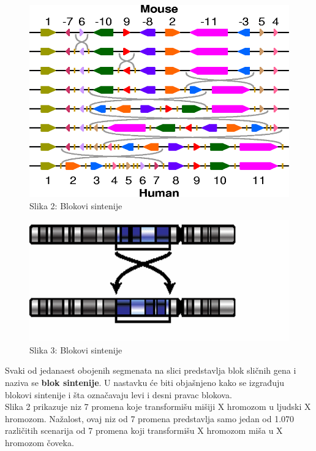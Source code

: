\documentclass{article}
\begin{document}
\begin{figure}[h!]
\centering
\includegraphics[scale=0.7]{slike/transformacija.png}
\caption{Slika 2: Blokovi sintenije}
\label{slika:X}
\end{figure}


\begin{figure}[h!]
\centering
\includegraphics[scale=0.7]{slike/transformacijaa.png}
\caption{Slika 3: Blokovi sintenije}
\label{slika:X}
\end{figure}

Svaki od jedanaest obojenih segmenata na slici predstavlja blok sličnih gena i naziva se \textbf{blok sintenije}. U nastavku će biti objašnjeno kako se izgrađuju blokovi sintenije i šta označavaju levi i desni pravac blokova.\\

Slika 2 prikazuje niz 7 promena koje transformišu mišiji X hromozom u ljudski X hromozom. Nažalost, ovaj niz od 7 promena predstavlja samo jedan od 1.070 različitih scenarija od 7 promena koji transformišu X hromozom miša u X hromozom čoveka.\\
\end{document}
